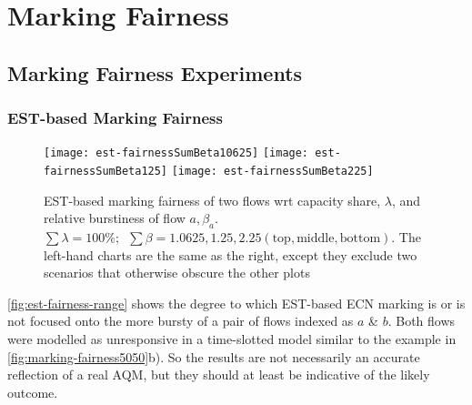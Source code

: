 \section{Marking Fairness}\label{sec:marking_fairness_discuss}

\subsection{Marking Fairness Experiments}\label{sec:marking_fairness_expts}

\subsubsection{EST-based Marking Fairness}\label{sec:marking_fairness_expts_est}

\begin{figure*}[t!]
	\centering
	\texttt{[image: est-fairnessSumBeta10625]}
	\texttt{[image: est-fairnessSumBeta125]}
	\texttt{[image: est-fairnessSumBeta225]}
	\caption{EST-based marking fairness of two flows wrt capacity share, \(\lambda\), and relative burstiness of flow \(a, \beta_a\).\\
	\(\sum\lambda=100\%; \enspace\sum\beta=1.0625, 1.25, 2.25 \mathrm{(top, middle, bottom)}\). 
	The left-hand charts are the same as the right, except they exclude two scenarios that otherwise obscure the other plots}\label{fig:est-fairness-range}
\end{figure*}

\autoref{fig:est-fairness-range} shows the degree to which EST-based ECN marking is or is not focused onto the more bursty of a pair of flows indexed as \(a\) \& \(b\). Both flows were modelled as unresponsive in a time-slotted model similar to the example in \autoref{fig:marking-fairness5050}b). So the results are not necessarily an accurate reflection of a real AQM, but they should at least be indicative of the likely outcome.

